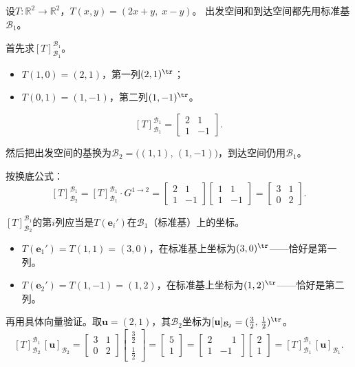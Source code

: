 \documentclass[12pt,UTF8,fontset=none]{ctexbook}
\begin{document}
\begin{ex}\label{ex:4_4_2}
设$T:\mathbb{R}^2\to\mathbb{R}^2$，$T(x,y) = (2x+y,\;x-y)$。
出发空间和到达空间都先用标准基$\mathcal{B}_1$。

首先求$[T]_{\mathcal{B}_1}^{\mathcal{B}_1}$。
\begin{itemize}
\item $T(1,0) = (2,1)$，第一列$(2,1)^{\tr}$；
\item $T(0,1) = (1,-1)$，第二列$(1,-1)^{\tr}$。
\end{itemize}
$$[T]_{\mathcal{B}_1}^{\mathcal{B}_1} = \begin{bmatrix} 2 & 1 \\ 1 & -1 \end{bmatrix}.$$

然后把出发空间的基换为$\mathcal{B}_2 = \big((1,1),\,(1,-1)\big)$，到达空间仍用$\mathcal{B}_1$。

按换底公式：
$$[T]_{\mathcal{B}_2}^{\mathcal{B}_1} = [T]_{\mathcal{B}_1}^{\mathcal{B}_1}\cdot G^{1\rightarrow 2} = \begin{bmatrix} 2 & 1 \\ 1 & -1 \end{bmatrix}\begin{bmatrix} 1 & 1 \\ 1 & -1 \end{bmatrix} = \begin{bmatrix} 3 & 1 \\ 0 & 2 \end{bmatrix}.$$

$[T]_{\mathcal{B}_2}^{\mathcal{B}_1}$的第$i$列应当是$T(\mathbf{e}_i')$在$\mathcal{B}_1$（标准基）上的坐标。
\begin{itemize}
\item $T(\mathbf{e}_1') = T(1,1) = (3,0)$，在标准基上坐标为$(3,0)^{\tr}$——恰好是第一列。
\item $T(\mathbf{e}_2') = T(1,-1) = (1,2)$，在标准基上坐标为$(1,2)^{\tr}$——恰好是第二列。
\end{itemize}

再用具体向量验证。取$\mathbf{u} = (2,1)$，其$\mathcal{B}_2$坐标为$[\mathbf{u}]_{\mathcal{B}_2} = (\frac{3}{2},\,\frac{1}{2})^{\tr}$。
$$[T]_{\mathcal{B}_2}^{\mathcal{B}_1}\,[\mathbf{u}]_{\mathcal{B}_2} = \begin{bmatrix} 3 & 1 \\ 0 & 2 \end{bmatrix}\begin{bmatrix} \frac{3}{2} \\[2pt] \frac{1}{2} \end{bmatrix} = \begin{bmatrix} 5 \\ 1 \end{bmatrix} = \begin{bmatrix} 2 & \phantom{-}1 \\ 1 & -1 \end{bmatrix} \begin{bmatrix} 2 \\ 1 \end{bmatrix} = [T]_{\mathcal{B}_1}^{\mathcal{B}_1}\,[\mathbf{u}]_{\mathcal{B}_1}.$$
\end{ex}
\end{document}

